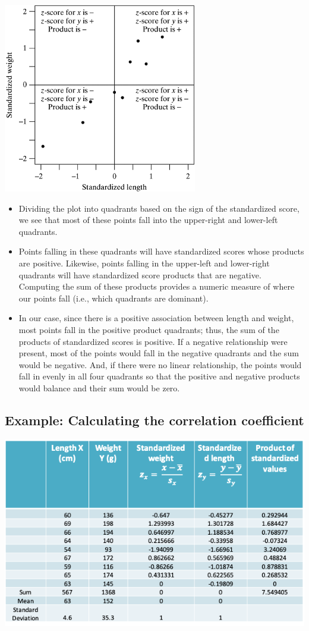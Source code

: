 \documentclass[
]{book}
\providecommand{\tightlist}{%
  \setlength{\itemsep}{0pt}\setlength{\parskip}{0pt}}
\begin{document}
\includegraphics[width=0.5\linewidth]{./11_42}

\begin{itemize}
\tightlist
\item
  Dividing the plot into quadrants based on the sign of the standardized score, we see that most of these points fall into the upper-right and lower-left quadrants.
\item
  Points falling in these quadrants will have standardized scores whose products are positive. Likewise, points falling in the upper-left and lower-right quadrants will have standardized score products that are negative. Computing the sum of these products provides a numeric measure of where our points fall (i.e., which quadrants are dominant).
\item
  In our case, since there is a positive association between length and weight, most points fall in the positive product quadrants; thus, the sum of the products of standardized scores is positive. If a negative relationship were present, most of the points would fall in the negative quadrants and the sum would be negative. And, if there were no linear relationship, the points would fall in evenly in all four quadrants so that the positive and negative products would balance and their sum would be zero.
\end{itemize}

\hypertarget{example-calculating-the-correlation-coefficient}{%
\subsection{Example: Calculating the correlation coefficient}\label{example-calculating-the-correlation-coefficient}}

\includegraphics[width=1\linewidth]{./11_44}
\end{document}
